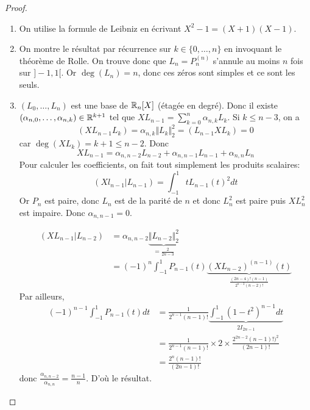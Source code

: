 \begin{proof}
\begin{enumerate}
		\item On utilise la formule de Leibniz en écrivant $X^{2}-1=(X+1)(X-1)$.
		\item On montre le résultat par récurrence sur $k\in\{0,\dots,n\}$ en invoquant le théorème de Rolle. On trouve donc que $L_{n}=P_{n}^{(n)}$ s'annule au moins $n$ fois sur $]-1,1[$. Or $\deg(L_{n})=n$, donc ces zéros sont simples et ce sont les seuls.
		\item $(L_{0},\dots,L_{n})$ est une base de $\mathbb{R}_{n}[X]$ (étagée en degré). Donc il existe $(\alpha_{n,0},\dots,\alpha_{n,k})\in\mathbb{R}^{k+1}$ tel que $XL_{n-1}=\sum_{k=0}^{n}\alpha_{n,k}L_{k}$. Si $k\leqslant n-3$, on a
		\begin{equation}(XL_{n-1} L_{k})=\alpha_{n,k}\Vert L_{k}\Vert_{2}^{2}=(L_{n-1}XL_{k})=0\end{equation}
		car $\deg(XL_{k})=k+1\leqslant n-2$. Donc 
		\begin{equation}XL_{n-1}=\alpha_{n,n-2}L_{n-2}+\alpha_{n,n-1}L_{n-1}+\alpha_{n,n}L_{n}\end{equation}
		Pour calculer les coefficients, on fait tout simplement les produits scalaires:
		\begin{equation}(Xl_{n-1}|L_{n-1})=\int_{-1}^{1}tL_{n-1}(t)^{2}dt\end{equation}
		Or $P_{n}$ est paire, donc $L_{n}$ est de la parité de $n$ et donc $L_{n}^{2}$ est paire puis $XL_{n}^{2}$ est impaire. Donc $\alpha_{n,n-1}=0$.

		\begin{align}
			(XL_{n-1}|L_{n-2})
			&=\alpha_{n,n-2}\underbrace{\Vert L_{n-2}\Vert_{2}^{2}}_{=\frac{2}{2n-3}}\\
			&=(-1)^{n}\int_{-1}^{1}P_{n-1}(t)\underbrace{(XL_{n-2})^{(n-1)}(t)}_{\frac{(2n-4)!(n-1)}{2^{n-2}(n-2)!}}
		\end{align}
		Par ailleurs,
		\begin{align}
			(-1)^{n-1}\int_{-1}^{1}P_{n-1}(t)dt
			&=\frac{1}{2^{n-1}(n-1)!}\underbrace{\int_{-1}^{1}(1-t^{2})^{n-1}dt}_{2I_{2n-1}}\\
			&=\frac{1}{2^{n-1}(n-1)!}\times 2\times\frac{2^{2n-2}(n-1)!)^{2}}{(2n-1)!}\\
			&=\frac{2^{n}(n-1)!}{(2n-1)!}
		\end{align}
		donc $\frac{\alpha_{n,n-2}}{\alpha_{n,n}}=\frac{n-1}{n}$. D'où le résultat.
	\end{enumerate}
\end{proof}


